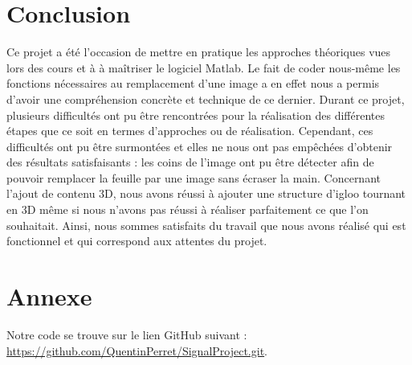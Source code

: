\documentclass[blue]{ceri/sty/rapport}
\begin{document}
\section{Conclusion}
Ce projet a été l'occasion de mettre en pratique les approches théoriques vues lors des cours et à à maîtriser le logiciel Matlab. Le fait de coder nous-même les fonctions nécessaires au remplacement d'une image a en effet nous a permis d'avoir une compréhension concrète et technique de ce dernier.
Durant ce projet, plusieurs difficultés ont pu être rencontrées pour la réalisation des différentes étapes que ce soit en termes d'approches ou de réalisation. Cependant, ces difficultés ont pu être surmontées et elles ne nous ont pas empêchées d'obtenir des résultats satisfaisants : les coins de l'image ont pu être détecter afin de pouvoir remplacer la feuille par une image sans écraser la main. Concernant l'ajout de contenu 3D, nous avons réussi à ajouter une structure d'igloo tournant en 3D même si nous n'avons pas réussi à réaliser parfaitement ce que l'on souhaitait. Ainsi, nous sommes satisfaits du travail que nous avons réalisé qui est fonctionnel et qui correspond aux attentes du projet. %

\section{Annexe}
Notre code se trouve sur le lien GitHub suivant : \url{https://github.com/QuentinPerret/SignalProject.git}.

\MyBibliography
\end{document}
